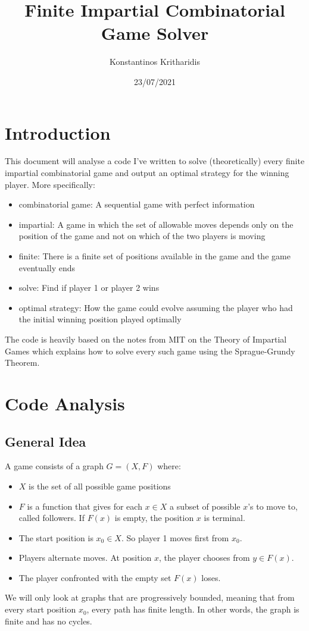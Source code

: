 \documentclass{article}
\title{Finite Impartial Combinatorial Game Solver}
\author{Konstantinos Kritharidis}
\date{23/07/2021}
\begin{document}
\maketitle

\section{Introduction}

This document will analyse a code I've written to solve (theoretically) every finite impartial combinatorial game and output an optimal strategy for the winning player. More specifically:
\begin{itemize}
  \item combinatorial game\cite{combinatorial_wiki}: A sequential game with perfect information
  \item impartial\cite{mit}: A game in which the set of allowable moves depends only on the position of the game and not on which of the two players is moving
  \item finite\cite{mit}: There is a finite set of positions available in the game and the game eventually ends
  \item solve: Find if player 1 or player 2 wins
  \item optimal strategy: How the game could evolve assuming the player who had the initial winning position played optimally
\end{itemize}
The code is heavily based on the notes\cite{mit} from MIT on the Theory of Impartial Games which explains how to solve every such game using the Sprague-Grundy Theorem\cite{sg}.

\section{Code Analysis}

\subsection{General Idea}

A game consists of a graph $G = (X, F)$ where\cite{mit}:
\begin{itemize}
\item $X$ is the set of all possible game positions
\item $F$ is a function that gives for each $x \in X$ a subset of possible $x$’s to move to, called followers. If $F(x)$ is empty, the position $x$ is terminal.
\item The start position is $x_0 \in X$. So player 1 moves first from $x_0$.
\item Players alternate moves. At position $x$, the player chooses from $y \in F(x)$.
\item The player confronted with the empty set $F(x)$ loses.
\end{itemize}
We will only look at graphs that are progressively bounded\cite{mit}, meaning that from every start position $x_0$, every path has finite length. In other words, the graph is finite and has no cycles.
\end{document}
